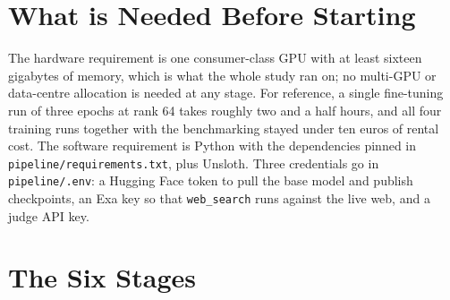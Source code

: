 \section*{What is Needed Before Starting}

The hardware requirement is one consumer-class GPU with at least sixteen gigabytes of memory, which is what the whole study ran on; no multi-GPU or data-centre allocation is needed at any stage. For reference, a single fine-tuning run of three epochs at rank 64 takes roughly two and a half hours, and all four training runs together with the benchmarking stayed under ten euros of rental cost. The software requirement is Python with the dependencies pinned in \texttt{pipeline/requirements.txt}, plus Unsloth. Three credentials go in \texttt{pipeline/.env}: a Hugging Face token to pull the base model and publish checkpoints, an Exa key so that \texttt{web\_search} runs against the live web, and a judge API key.

\section*{The Six Stages}

